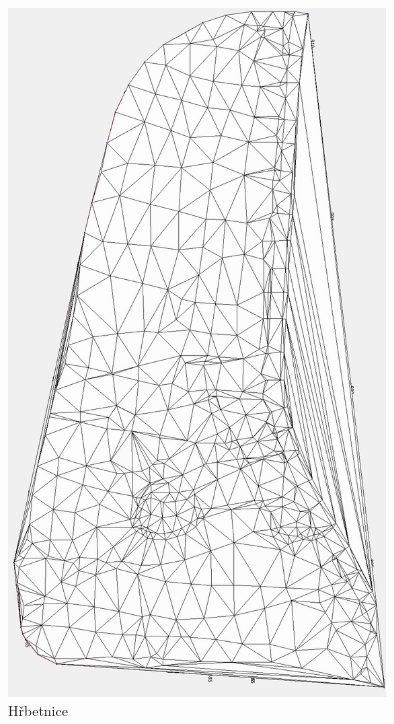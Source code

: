 \documentclass[a4paper, 12pt]{article}
\begin{document}
\clearpage
\begin{figure}[h]
	\centering
	\includegraphics[width=10cm]{dmt_nas.jpg}
	\caption{Hřbetnice}
\end{figure}
\end{document}
